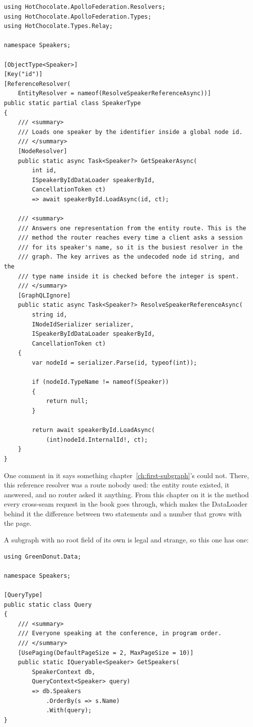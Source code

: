 \begin{verbatim}
using HotChocolate.ApolloFederation.Resolvers;
using HotChocolate.ApolloFederation.Types;
using HotChocolate.Types.Relay;

namespace Speakers;

[ObjectType<Speaker>]
[Key("id")]
[ReferenceResolver(
    EntityResolver = nameof(ResolveSpeakerReferenceAsync))]
public static partial class SpeakerType
{
    /// <summary>
    /// Loads one speaker by the identifier inside a global node id.
    /// </summary>
    [NodeResolver]
    public static async Task<Speaker?> GetSpeakerAsync(
        int id,
        ISpeakerByIdDataLoader speakerById,
        CancellationToken ct)
        => await speakerById.LoadAsync(id, ct);

    /// <summary>
    /// Answers one representation from the entity route. This is the
    /// method the router reaches every time a client asks a session
    /// for its speaker's name, so it is the busiest resolver in the
    /// graph. The key arrives as the undecoded node id string, and the
    /// type name inside it is checked before the integer is spent.
    /// </summary>
    [GraphQLIgnore]
    public static async Task<Speaker?> ResolveSpeakerReferenceAsync(
        string id,
        INodeIdSerializer serializer,
        ISpeakerByIdDataLoader speakerById,
        CancellationToken ct)
    {
        var nodeId = serializer.Parse(id, typeof(int));

        if (nodeId.TypeName != nameof(Speaker))
        {
            return null;
        }

        return await speakerById.LoadAsync(
            (int)nodeId.InternalId!, ct);
    }
}
\end{verbatim}

%
One comment in it says something chapter~\ref{ch:first-subgraph}'s could not.
There, this reference resolver was a route nobody used: the entity route
existed, it answered, and no router asked it anything. From this chapter on it
is the method every cross-seam request in the book goes through, which makes
the DataLoader behind it the difference between two statements and a number
that grows with the page.

%
A subgraph with no root field of its own is legal and strange, so this one has
one:

\begin{verbatim}
using GreenDonut.Data;

namespace Speakers;

[QueryType]
public static class Query
{
    /// <summary>
    /// Everyone speaking at the conference, in program order.
    /// </summary>
    [UsePaging(DefaultPageSize = 2, MaxPageSize = 10)]
    public static IQueryable<Speaker> GetSpeakers(
        SpeakerContext db,
        QueryContext<Speaker> query)
        => db.Speakers
            .OrderBy(s => s.Name)
            .With(query);
}
\end{verbatim}

